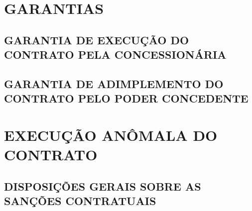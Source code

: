 \documentclass[a4paper,11pt]{report} %
\begin{document}
\chapter{GARANTIAS}
\section{GARANTIA DE EXECUÇÃO DO CONTRATO PELA CONCESSIONÁRIA}
\label{sec:CBKD}

\section{GARANTIA DE ADIMPLEMENTO DO CONTRATO PELO PODER CONCEDENTE}
\label{sec:WYDY}

\chapter{EXECUÇÃO ANÔMALA DO CONTRATO}
\section{DISPOSIÇÕES GERAIS SOBRE AS SANÇÕES CONTRATUAIS}
\label{sec:78Q7}
\end{document}
